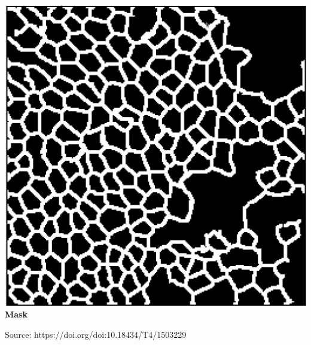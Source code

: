 \begin{frame}
\begin{minipage}[h!]{0.40\textwidth}
    \centering
    \includegraphics[scale=0.13]{./img/3_benchmark/mask.png}
    \textbf{Mask}
  \end{minipage}

  \bigskip

  Source: https://doi.org/doi:10.18434/T4/1503229

\end{frame}

\def\slidetitle{Accuracy for 'cell boundary'}

